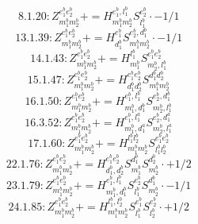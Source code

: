 \documentclass[letterpaper,10pt,fleqn,leqno,onecolumn]{article}
\begin{document}
\begin{equation} \;\;\;\;\;\;  8.1.20: Z^{e_{1}^{b}e_{2}^{b}}_{m_{1}^{b}m_{2}^{b}}+=H^{e_{1}^{b},l_{1}^{b}}_{m_{1}^{b}m_{2}^{b}}S^{e_{2}^{b}}_{l_{1}^{b}}\cdot -1/1 \end{equation}
\begin{equation} \;\;\;\;\;\;  13.1.39: Z^{e_{1}^{b}e_{2}^{b}}_{m_{1}^{b}m_{2}^{b}}+=H^{e_{1}^{b}}_{d_{1}^{b}}S^{e_{2}^{b},d_{1}^{b}}_{m_{1}^{b}m_{2}^{b}}\cdot -1/1 \end{equation}
\begin{equation} \;\;\;\;\;\;  14.1.43: Z^{e_{1}^{b}e_{2}^{b}}_{m_{1}^{b}m_{2}^{b}}+=H^{l_{1}^{b}}_{m_{1}^{b}}S^{e_{1}^{b}e_{2}^{b}}_{m_{2}^{b},l_{1}^{b}} \end{equation}
\begin{equation} \;\;\;\;\;\;  15.1.47: Z^{e_{1}^{b}e_{2}^{b}}_{m_{1}^{b}m_{2}^{b}}+=H^{e_{1}^{b}e_{2}^{b}}_{d_{1}^{b}d_{2}^{b}}S^{d_{1}^{b}d_{2}^{b}}_{m_{1}^{b}m_{2}^{b}} \end{equation}
\begin{equation} \;\;\;\;\;\;  16.1.50: Z^{e_{1}^{b}e_{2}^{b}}_{m_{1}^{b}m_{2}^{b}}+=H^{e_{1}^{b},l_{1}^{b}}_{m_{1}^{b},d_{1}^{b}}S^{e_{2}^{b},d_{1}^{b}}_{m_{2}^{b},l_{1}^{b}} \end{equation}
\begin{equation} \;\;\;\;\;\;  16.3.52: Z^{e_{1}^{b}e_{2}^{b}}_{m_{1}^{b}m_{2}^{b}}+=H^{e_{1}^{b},l_{1}^{a}}_{m_{1}^{b},d_{1}^{a}}S^{e_{2}^{b},d_{1}^{a}}_{m_{2}^{b},l_{1}^{a}} \end{equation}
\begin{equation} \;\;\;\;\;\;  17.1.60: Z^{e_{1}^{b}e_{2}^{b}}_{m_{1}^{b}m_{2}^{b}}+=H^{l_{1}^{b}l_{2}^{b}}_{m_{1}^{b}m_{2}^{b}}S^{e_{1}^{b}e_{2}^{b}}_{l_{1}^{b}l_{2}^{b}} \end{equation}
\begin{equation} \;\;\;\;\;\;  22.1.76: Z^{e_{1}^{b}e_{2}^{b}}_{m_{1}^{b}m_{2}^{b}}+=H^{e_{1}^{b}e_{2}^{b}}_{d_{1}^{b},d_{2}^{b}}S^{d_{1}^{b}}_{m_{1}^{b}}S^{d_{2}^{b}}_{m_{2}^{b}}\cdot +1/2 \end{equation}
\begin{equation} \;\;\;\;\;\;  23.1.79: Z^{e_{1}^{b}e_{2}^{b}}_{m_{1}^{b}m_{2}^{b}}+=H^{e_{1}^{b},l_{1}^{b}}_{m_{1}^{b},d_{1}^{b}}S^{e_{2}^{b}}_{l_{1}^{b}}S^{d_{1}^{b}}_{m_{2}^{b}}\cdot -1/1 \end{equation}
\begin{equation} \;\;\;\;\;\;  24.1.85: Z^{e_{1}^{b}e_{2}^{b}}_{m_{1}^{b}m_{2}^{b}}+=H^{l_{1}^{b},l_{2}^{b}}_{m_{1}^{b}m_{2}^{b}}S^{e_{1}^{b}}_{l_{1}^{b}}S^{e_{2}^{b}}_{l_{2}^{b}}\cdot +1/2 \end{equation}
\end{document}
